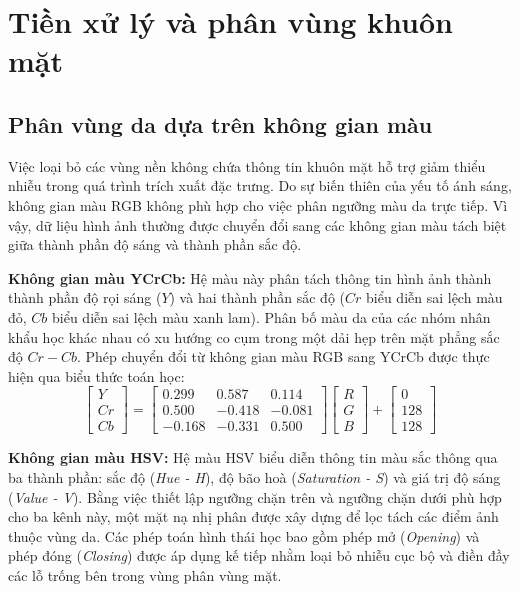 \section{Tiền xử lý và phân vùng khuôn mặt}
\subsection{Phân vùng da dựa trên không gian màu}
Việc loại bỏ các vùng nền không chứa thông tin khuôn mặt hỗ trợ giảm thiểu nhiễu trong quá trình trích xuất đặc trưng. Do sự biến thiên của yếu tố ánh sáng, không gian màu RGB không phù hợp cho việc phân ngưỡng màu da trực tiếp. Vì vậy, dữ liệu hình ảnh thường được chuyển đổi sang các không gian màu tách biệt giữa thành phần độ sáng và thành phần sắc độ.

\textbf{Không gian màu YCrCb:}
Hệ màu này phân tách thông tin hình ảnh thành thành phần độ rọi sáng ($Y$) và hai thành phần sắc độ ($Cr$ biểu diễn sai lệch màu đỏ, $Cb$ biểu diễn sai lệch màu xanh lam). Phân bố màu da của các nhóm nhân khẩu học khác nhau có xu hướng co cụm trong một dải hẹp trên mặt phẳng sắc độ $Cr-Cb$. Phép chuyển đổi từ không gian màu RGB sang YCrCb được thực hiện qua biểu thức toán học:
$$
\begin{bmatrix} Y \\ Cr \\ Cb \end{bmatrix} = \begin{bmatrix} 0.299 & 0.587 & 0.114 \\ 0.500 & -0.418 & -0.081 \\ -0.168 & -0.331 & 0.500 \end{bmatrix} \begin{bmatrix} R \\ G \\ B \end{bmatrix} + \begin{bmatrix} 0 \\ 128 \\ 128 \end{bmatrix}
$$

\textbf{Không gian màu HSV:}
Hệ màu HSV biểu diễn thông tin màu sắc thông qua ba thành phần: sắc độ (\textit{Hue - H}), độ bão hoà (\textit{Saturation - S}) và giá trị độ sáng (\textit{Value - V}). Bằng việc thiết lập ngưỡng chặn trên và ngưỡng chặn dưới phù hợp cho ba kênh này, một mặt nạ nhị phân được xây dựng để lọc tách các điểm ảnh thuộc vùng da. Các phép toán hình thái học bao gồm phép mở (\textit{Opening}) và phép đóng (\textit{Closing}) được áp dụng kế tiếp nhằm loại bỏ nhiễu cục bộ và điền đầy các lỗ trống bên trong vùng phân vùng mặt.

